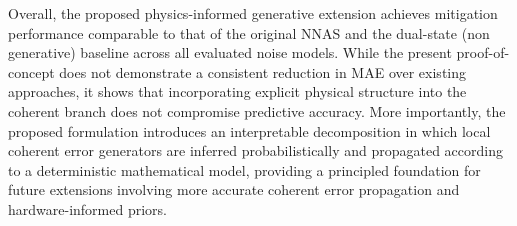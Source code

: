Overall, the proposed physics-informed generative extension achieves mitigation performance comparable to that of the original NNAS and the dual-state (non generative) baseline across all evaluated noise models. While the present proof-of-concept does not demonstrate a consistent reduction in MAE over existing approaches, it shows that incorporating explicit physical structure into the coherent branch does not compromise predictive accuracy. More importantly, the proposed formulation introduces an interpretable decomposition in which local coherent error generators are inferred probabilistically and propagated according to a deterministic mathematical model, providing a principled foundation for future extensions involving more accurate coherent error propagation and hardware-informed priors.
